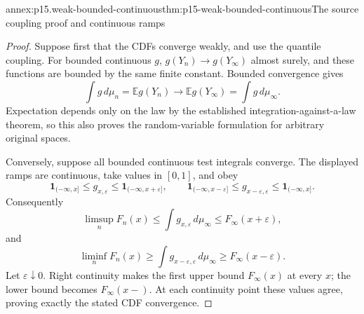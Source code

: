 \begin{annexitem}{annex:p15.weak-bounded-continuous}{thm:p15-weak-bounded-continuous}{The source coupling proof and continuous ramps}
\begin{proof}
Suppose first that the CDFs converge weakly, and use the
quantile coupling. For bounded continuous \(g\),
\(g(Y_n)\to g(Y_\infty)\) almost surely, and these functions
are bounded by the same finite constant.
Bounded convergence gives
\[
 \int g\,d\mu_n=\mathbb E g(Y_n)
    \longrightarrow\mathbb E g(Y_\infty)=\int g\,d\mu_\infty.
\]
Expectation depends only on the law by the established
integration-against-a-law theorem, so this also proves the
random-variable formulation for arbitrary original spaces.

Conversely, suppose all bounded continuous test integrals
converge. The displayed ramps are continuous, take values
in \([0,1]\), and obey
\[
 \mathbf1_{(-\infty,x]}\leq g_{x,\varepsilon}
       \leq\mathbf1_{(-\infty,x+\varepsilon]},\qquad
 \mathbf1_{(-\infty,x-\varepsilon]}
       \leq g_{x-\varepsilon,\varepsilon}
       \leq\mathbf1_{(-\infty,x]}.
\]
Consequently
\[
 \limsup_nF_n(x)\leq \int g_{x,\varepsilon}\,d\mu_\infty
                                      \leq F_\infty(x+\varepsilon),
\]
and
\[
 \liminf_nF_n(x)\geq\int g_{x-\varepsilon,\varepsilon}\,d\mu_\infty
                                      \geq F_\infty(x-\varepsilon).
\]
Let \(\varepsilon\downarrow0\). Right continuity makes the
first upper bound \(F_\infty(x)\) at every \(x\); the lower
bound becomes \(F_\infty(x-)\). At each continuity point
these values agree, proving exactly the stated CDF convergence.
\end{proof}
\end{annexitem}

